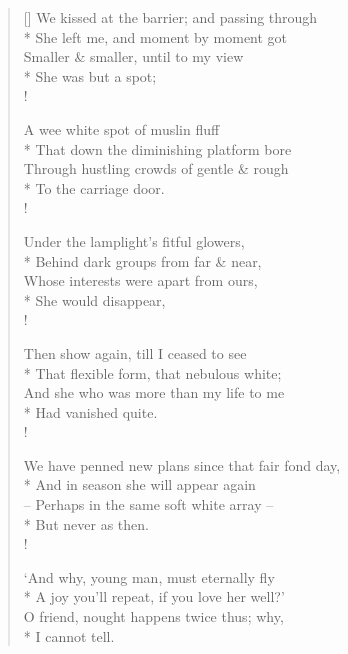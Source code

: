 \documentclass[MAIN]{subfiles}
\begin{document}
\settowidth{\versewidth}{We kissed at the barrier; and passing through}
\begin{verse}[\versewidth]
We kissed at the barrier; and passing through\\* 
She left me, and moment by moment got\\
Smaller \& smaller, until to my view\\*
\vin She was but a spot;\\!

A wee white spot of muslin fluff\\*
That down the diminishing platform bore\\
Through hustling crowds of gentle \& rough\\*
\vin To the carriage door.\\!

Under the lamplight's fitful glowers,\\*
Behind dark groups from far \& near,\\
Whose interests were apart from ours,\\*
\vin She would disappear,\\!

Then show again, till I ceased to see\\*
That flexible form, that nebulous white;\\
And she who was more than my life to me\\*
\vin Had vanished quite.\\!

We have penned new plans since that fair fond day,\\*
And in season she will appear again\\
-- Perhaps in the same soft white array --\\*
\vin But never as then.\\!

`And why, young man, must eternally fly\\*
A joy you'll repeat, if you love her well?'\\
O friend, nought happens twice thus; why,\\*
\vin I cannot tell.
\end{verse}
\end{document}
